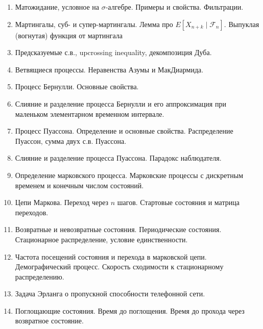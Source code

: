 \documentclass[12pt]{article}
\newcommand\F{\mathcal{F}}
\begin{document}
\begin{enumerate}
  \item Матожидание, условное на $\sigma$-алгебре. Примеры и свойства. Фильтрации.
  \item Мартингалы, суб- и супер-мартингалы. Лемма про $E[X_{n + k} \mid \F_n]$. Выпуклая (вогнутая) функция от мартингала
  \item Предсказуемые с.в., upcrossing inequality, декомпозиция Дуба.
  \item Ветвящиеся процессы. Неравенства Азумы и МакДиармида.
  \item Процесс Бернулли. Основные свойства.
  \item Слияние и разделение процесса Бернулли и его аппроксимация при маленьком элементарном временном интервале.
  \item Процесс Пуассона. Определение и основные свойства. Распределение Пуассон, сумма двух с.в. Пуассона.
  \item Слияние и разделение процесса Пуассона. Парадокс наблюдателя.
  \item Определение марковского процесса. Марковские процессы с дискретным временем и конечным числом состояний.
  \item Цепи Маркова. Переход через $n$ шагов. Стартовые состояния и матрица переходов.
  \item Возвратные и невозвратные состояния. Периодические состояния. Стационарное распределение, условие единственности. 
  \item Частота посещений состояния и перехода в марковской цепи. Демографический процесс. Скорость сходимости к стационарному распределению.
  \item Задача Эрланга о пропускной способности телефонной сети.
  \item Поглощающие состояния. Время до поглощения. Время до прохода через возвратное состояние.
\end{enumerate}
\end{document}
